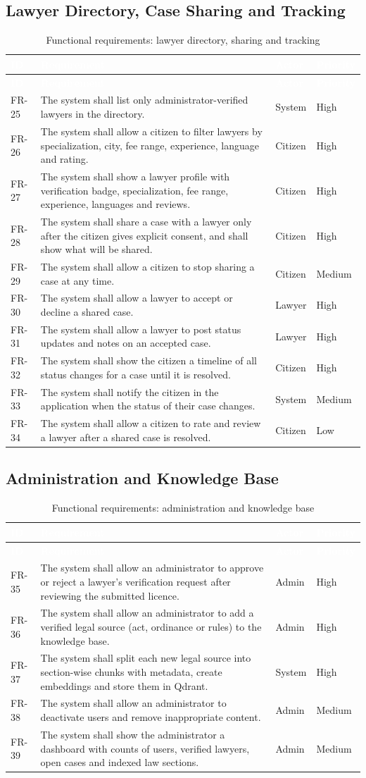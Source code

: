 \documentclass[12pt,a4paper]{report}
\newcommand{\thd}[1]{\textcolor{white}{\textbf{#1}}}
\newcommand{\headrow}{\rowcolor{tablehead}}
\newcommand{\fr}[4]{#1 & #2 & #3 & #4 \\ \hline}
\newcommand{\frhead}{\hline\headrow \thd{ID} & \thd{Requirement} & \thd{Actor} & \thd{Priority} \\ \hline}
\begin{document}
\subsection{Lawyer Directory, Case Sharing and Tracking}
\begin{longtable}{|p{1.4cm}|L{9.0cm}|L{2.0cm}|L{1.6cm}|}
\caption{Functional requirements: lawyer directory, sharing and tracking}\label{tab:fr-lawyer}\\
\frhead\endfirsthead \frhead\endhead
\fr{FR-25}{The system shall list only administrator-verified lawyers in the directory.}{System}{High}
\fr{FR-26}{The system shall allow a citizen to filter lawyers by specialization, city, fee range, experience, language and rating.}{Citizen}{High}
\fr{FR-27}{The system shall show a lawyer profile with verification badge, specialization, fee range, experience, languages and reviews.}{Citizen}{High}
\fr{FR-28}{The system shall share a case with a lawyer only after the citizen gives explicit consent, and shall show what will be shared.}{Citizen}{High}
\fr{FR-29}{The system shall allow a citizen to stop sharing a case at any time.}{Citizen}{Medium}
\fr{FR-30}{The system shall allow a lawyer to accept or decline a shared case.}{Lawyer}{High}
\fr{FR-31}{The system shall allow a lawyer to post status updates and notes on an accepted case.}{Lawyer}{High}
\fr{FR-32}{The system shall show the citizen a timeline of all status changes for a case until it is resolved.}{Citizen}{High}
\fr{FR-33}{The system shall notify the citizen in the application when the status of their case changes.}{System}{Medium}
\fr{FR-34}{The system shall allow a citizen to rate and review a lawyer after a shared case is resolved.}{Citizen}{Low}
\end{longtable}

\subsection{Administration and Knowledge Base}
\begin{longtable}{|p{1.4cm}|L{9.0cm}|L{2.0cm}|L{1.6cm}|}
\caption{Functional requirements: administration and knowledge base}\label{tab:fr-admin}\\
\frhead\endfirsthead \frhead\endhead
\fr{FR-35}{The system shall allow an administrator to approve or reject a lawyer's verification request after reviewing the submitted licence.}{Admin}{High}
\fr{FR-36}{The system shall allow an administrator to add a verified legal source (act, ordinance or rules) to the knowledge base.}{Admin}{High}
\fr{FR-37}{The system shall split each new legal source into section-wise chunks with metadata, create embeddings and store them in Qdrant.}{System}{High}
\fr{FR-38}{The system shall allow an administrator to deactivate users and remove inappropriate content.}{Admin}{Medium}
\fr{FR-39}{The system shall show the administrator a dashboard with counts of users, verified lawyers, open cases and indexed law sections.}{Admin}{Medium}
\end{longtable}
\end{document}
